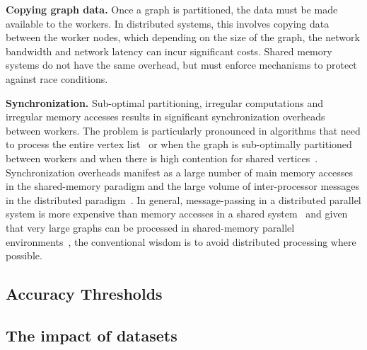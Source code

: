 \textbf{Copying graph data.}
Once a graph is partitioned, the data must be made available to the workers. 
In distributed systems, this involves copying data between the worker nodes, which depending on the size of the graph, the network bandwidth and network latency can incur significant costs. 
Shared memory systems do not have the same overhead, but must enforce mechanisms to protect against race conditions. 

\textbf{Synchronization.}
Sub-optimal partitioning, irregular computations and irregular memory accesses results in significant synchronization overheads between workers. 
The problem is particularly pronounced in algorithms that need to process the entire vertex list~\cite{Satish2014} or when the graph is sub-optimally partitioned between workers and when there is high contention for shared vertices~\cite{Chen2019}.
Synchronization overheads manifest as a large number of main memory accesses in the shared-memory paradigm and the large volume of inter-processor messages in the distributed paradigm~\cite{Beamer2015}.
In general, message-passing in a distributed parallel system is more expensive than memory accesses in a shared system~\cite{Beamer2015} and given that very large graphs can be processed in shared-memory parallel environments~\cite{Beamer2015, Dhulipala2021}, the conventional wisdom is to avoid distributed processing where possible. 


\subsection{Accuracy Thresholds}

\subsection{The impact of datasets}

